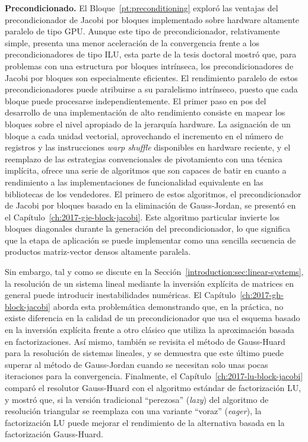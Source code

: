 \noindent\textbf{Precondicionado.}
El Bloque~\ref{pt:preconditioning} exploró las ventajas del precondicionador de
Jacobi por bloques implementado sobre hardware altamente paralelo de tipo GPU.
Aunque este tipo de precondicionador, relativamente simple, presenta una menor
aceleración de la convergencia frente a los precondicionadores de tipo ILU, esta
parte de la tesis doctoral mostró que, para problemas con una estructura por
bloques intrínseca, los precondicionadores de Jacobi por bloques son
especialmente eficientes.  El rendimiento paralelo de estos precondicionadores
puede atribuirse a su paralelismo intrínseco, puesto que cada bloque puede
procesarse independientemente. El primer paso en pos del desarrollo de una
implementación de alto rendimiento consiste en mapear los bloques sobre el nivel
apropiado de la jerarquía hardware. La asignación de un bloque a cada unidad
vectorial, aprovechando el incremento en el número de registros y las
instrucciones \textit{warp shuffle} disponibles en hardware reciente, y el
reemplazo de las estrategias convencionales de pivotamiento con una técnica
implícita, ofrece una serie de algoritmos que son capaces de batir en cuanto a
rendimiento a las implementaciones de funcionalidad equivalente en las
bibliotecas de los vendedores.  El primero de estos algoritmos, el
precondicionador de Jacobi por bloques basado en la eliminación de Gauss-Jordan,
se presentó en el Capítulo~\ref{ch:2017-gje-block-jacobi}.  Este algoritmo
particular invierte los bloques diagonales durante la generación del
precondicionador, lo que significa que la etapa de aplicación se puede
implementar como una sencilla secuencia de productos matriz-vector densos
altamente paralela.


Sin embargo, tal y como se discute en la
Sección~\ref{introduction:sec:linear-systems}, la resolución de un sistema
lineal mediante la inversión explícita de matrices en general puede introducir
inestabilidades numéricas. El Capítulo~\ref{ch:2017-gh-block-jacobi} aborda esta
problemática demonstrando que, en la práctica, no existe diferencia en la
calidad de un precondicionador que usa el esquema basado en la inversión
explícita frente a otro clásico que utiliza la aproximación basada en
factorizaciones. Así mismo, también se revisita el método de Gauss-Huard para la
resolución de sistemas lineales, y se demuestra que este último puede superar al
método de Gauss-Jordan cuando se necesitan solo unas pocas iteraciones para la
convergencia.  Finalmente, el Capítulo~\ref{ch:2017-lu-block-jacobi} comparó el
resolutor Gauss-Huard con el algoritmo estándar de factorización LU, y mostró
que, si la versión tradicional ``perezosa'' (\textit{lazy}) del algoritmo de
resolución triangular se reemplaza con una variante ``voraz'' (\textit{eager}),
la factorización LU puede mejorar el rendimiento de la alternativa basada en la
factorización Gauss-Huard.

